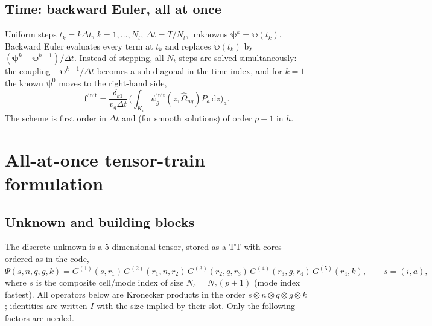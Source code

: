 \documentclass[11pt,a4paper]{article}
\numberwithin{equation}{section}
\theoremstyle{remark}
\newcommand{\Om}{\hat{\Omega}}
\newcommand{\dd}{\mathrm{d}}
\newcommand{\kron}{\otimes}
\begin{document}
\subsection{Time: backward Euler, all at once}
\label{sec:time}

Uniform steps $t_k=k\Delta t$, $k=1,\dots,N_t$, $\Delta t=T/N_t$, unknowns $\bm\psi^k=\bm\psi(t_k)$. Backward Euler evaluates every term at $t_k$ and replaces $\dot{\bm\psi}(t_k)$ by $(\bm\psi^k-\bm\psi^{k-1})/\Delta t$.
Instead of stepping, all $N_t$ steps are solved simultaneously: the coupling $-\bm\psi^{k-1}/\Delta t$ becomes a sub-diagonal in the time index, and for $k=1$ the known $\bm\psi^0$ moves to the right-hand side,
\begin{equation}
\bm f^{\,\mathrm{init}}=\frac{\delta_{k1}}{v_g\Delta t}\,\Big(\int_{K_i}\psi^{\mathrm{init}}_g(z,\Om_{nq})P_a\,\dd z\Big)_a .
\end{equation}
The scheme is first order in $\Delta t$ and (for smooth solutions) of order $p+1$ in $h$.

\section{All-at-once tensor-train formulation}
\label{sec:tt-operator}

\subsection{Unknown and building blocks}

The discrete unknown is a 5-dimensional tensor, stored as a TT with cores ordered as in the code,
\begin{equation}
\Psi(s,n,q,g,k)=G^{(1)}(s,r_1)\,G^{(2)}(r_1,n,r_2)\,G^{(3)}(r_2,q,r_3)\,G^{(4)}(r_3,g,r_4)\,G^{(5)}(r_4,k),
\qquad s=(i,a),
\end{equation}
where $s$ is the composite cell/mode index of size $N_s=N_z(p+1)$ (mode index fastest). All operators below are Kronecker products in the order $s\kron n\kron q\kron g\kron k$; identities are written $I$ with the size implied by their slot. Only the following factors are needed.
\end{document}
